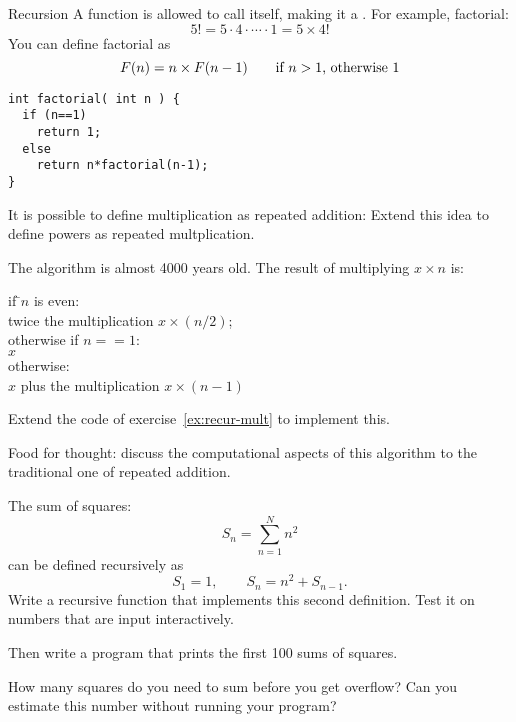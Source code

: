 \begin{slide}{Recursion}
  \label{sl:func-recur}
  A function is allowed to call itself, making it a .
  For example, factorial:
  \[ 5! = 5\cdot 4 \cdot \cdots \cdot 1 = 5 \times 4! \]
  You can define factorial as
  \[ F(n) = n \times F(n-1) \qquad \hbox{if $n>1$, otherwise~$1$} \]
\begin{lstlisting}
int factorial( int n ) {
  if (n==1)
    return 1;
  else
    return n*factorial(n-1);
}
\end{lstlisting}
\end{slide}

\begin{exercise}
  \label{ex:recur-mult}
  It is possible to define multiplication as repeated addition:
  Extend this idea to define powers as repeated multplication.
\end{exercise}

\begin{exercise}
  \label{ex:peasant-mult}
  The  algorithm is almost 4000 years old.
  The result of multiplying $x\times n$ is:

  \begin{tabbing}
    if \=$n$ is even:\\
    \> twice the multiplication $x\times (n/2)$;\\
    otherwise if $n==1$:\\
    \> $x$\\
    otherwise:\\
    \> $x$ plus the multiplication $x \times (n-1)$\\
  \end{tabbing}

  Extend the code of exercise~\ref{ex:recur-mult} to implement this.

  Food for thought: discuss the computational aspects of this algorithm
  to the traditional one of repeated addition.
\end{exercise}

\begin{exercise}
  \label{ex:recur-sum}
  The sum of squares:
  \[ S_n = \sum_{n=1}^N n^2 \]
  can be defined recursively as
  \[ S_1=1,\qquad S_n = n^2 + S_{n-1}. \]
  Write a recursive function that implements this second definition.
  Test it on numbers that are input interactively.

  Then write a program that prints the first 100 sums of squares.

  How many squares do you need to sum before you get overflow?
  Can you estimate this number without running your program?
\end{exercise}

